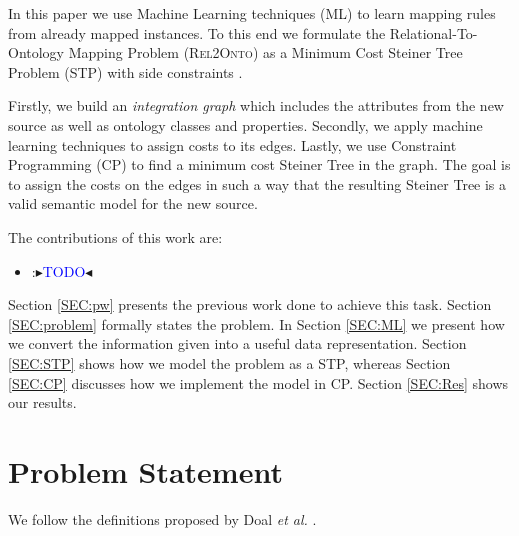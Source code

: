 \documentclass[letterpaper]{article} %
\newcommand{\authornote}[3]{
  {\fbox{\sc 
  #1}:$\blacktriangleright$\textcolor{#2}{\small{#3}}$\blacktriangleleft$}%
}
\newcommand{\ddg}[1]{\authornote{DDG}{blue}{#1}}
\newcommand{\relonto}{\textsc{Rel2Onto}}
\newcommand{\etal}{\textit{et al.}}
\begin{document}
In this paper we use Machine Learning techniques (ML) to learn mapping rules from already mapped instances.
To this end we formulate the Relational-To-Ontology Mapping Problem (\relonto{}) as a Minimum Cost Steiner Tree Problem (STP) with side constraints \cite{deuna2016steiner}.

Firstly, we build an \emph{integration graph} which includes the 
attributes from the new source as well as ontology classes and properties. 
Secondly, we apply machine learning techniques to 
assign costs to its edges. 
Lastly, we use Constraint Programming (CP) to 
find a minimum cost Steiner Tree in the graph.
The goal is to assign the costs on the edges in such a way that the resulting Steiner Tree is a valid semantic model for the new source. 

The contributions of this work are:
\begin{itemize}
	\item \ddg{TODO}
\end{itemize}

Section \ref{SEC:pw} presents the previous work done to achieve this task. 
Section \ref{SEC:problem} formally states the problem. 
In Section \ref{SEC:ML} we present how we convert the information given into a 
useful data representation. 
Section \ref{SEC:STP} shows how we model the problem as a STP, 
whereas Section \ref{SEC:CP} discusses how we implement the model in CP. 
Section \ref{SEC:Res} shows our results. 

\section{Problem Statement \label{SEC:problem}}
We follow the definitions proposed by Doal \etal{} \cite{doan2012principles}.
\end{document}
